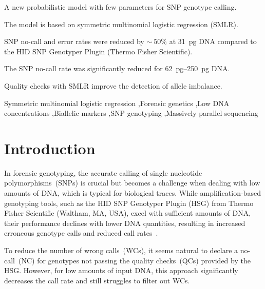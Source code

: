 \documentclass[preprint,5p,times,11pt]{elsarticle}
\begin{document}
\begin{frontmatter}
\onecolumn
\begin{highlights}
\item A new probabilistic model with few parameters for SNP genotype calling.
\item The model is based on symmetric multinomial logistic regression (SMLR).
\item SNP no-call and error rates were reduced by $\sim\!\!\!\:50\%$ at \SI{31}{\pg} DNA compared to the HID SNP Genotyper Plugin (Thermo Fisher Scientific).
\item The SNP no-call rate was significantly reduced for \SIrange[range-units = single, range-phrase = --]{62}{250}{\pg} DNA.
\item Quality checks with SMLR improve the detection of allele imbalance.
\end{highlights}

\begin{keyword}
Symmetric multinomial logistic regression \sep Forensic genetics \sep Low DNA concentrations \sep Biallelic markers \sep SNP genotyping \sep Massively parallel sequencing


\end{keyword}
\end{frontmatter}


\section{Introduction}
In forensic genotyping, the accurate calling of single nucleotide polymorphisms~(SNPs) is crucial but becomes a challenge when dealing with low amounts of DNA, which is typical for biological traces.
While amplification-based genotyping tools, such as the HID SNP Genotyper Plugin (HSG) from Thermo Fisher Scientific (Waltham, MA, USA), excel with sufficient amounts of DNA, their performance declines with lower DNA quantities, resulting in increased erroneous genotype calls and reduced call rates~\cite{alasfi, mostad, butler, swgdam}.

To reduce the number of wrong calls~(WCs), it seems natural to declare a no-call~(NC) for genotypes not passing the quality checks~(QCs) provided by the HSG.
However, for low amounts of input DNA, this approach significantly decreases the call rate and still struggles to filter out WCs.
\end{document}
